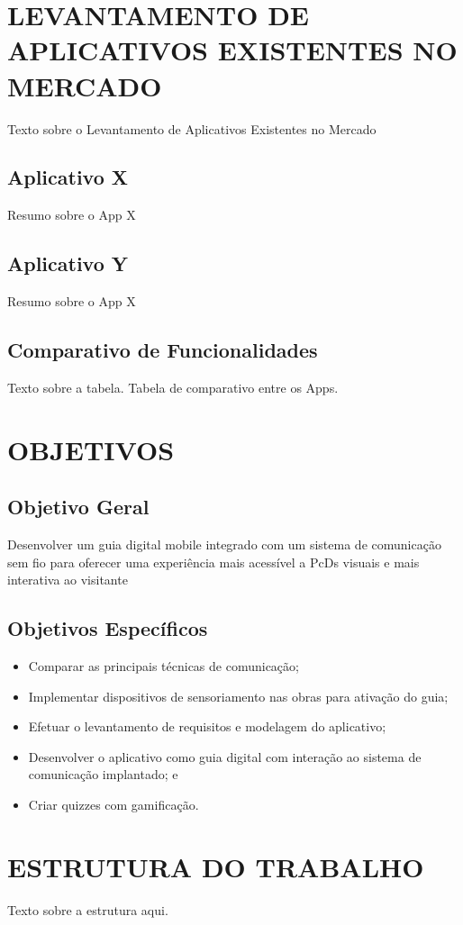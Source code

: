 \section{LEVANTAMENTO DE APLICATIVOS EXISTENTES NO MERCADO}

Texto sobre o Levantamento de Aplicativos Existentes no Mercado

\subsection{Aplicativo X}

Resumo sobre o App X

\subsection{Aplicativo Y}

Resumo sobre o App X

\subsection{Comparativo de Funcionalidades}

Texto sobre a tabela.
Tabela de comparativo entre os Apps.

\section{OBJETIVOS}

\subsection{Objetivo Geral}

Desenvolver um guia digital mobile integrado com um sistema de comunicação
sem fio para oferecer uma experiência mais acessível a PcDs visuais e mais interativa ao visitante

\subsection{Objetivos Específicos}

\vspace*{0pt}

\begin{itemize}
	\item Comparar as principais técnicas de comunicação;
	
	\item Implementar dispositivos de sensoriamento nas obras para ativação do guia;

    \item Efetuar o levantamento de requisitos e modelagem do aplicativo;

    \item Desenvolver o aplicativo como guia digital com interação ao sistema de comunicação implantado; e
    
    \item Criar quizzes com gamificação.
    
\end{itemize}

\section{ESTRUTURA DO TRABALHO}

Texto sobre a estrutura aqui.
